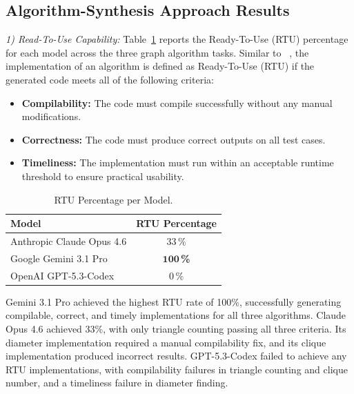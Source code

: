 
\subsection{Algorithm-Synthesis Approach Results}

\indent \textit{1) Read-To-Use Capability:} Table~\ref{tab:rtu} reports the Ready-To-Use (RTU) percentage for each model across the three graph algorithm tasks. Similar to \citeauthor{llmgen2025}~\cite{llmgen2025}, the implementation of an algorithm is defined as Ready-To-Use (RTU) if the generated code meets all of the following criteria:

\begin{itemize}
  \item \textbf{Compilability:} The code must compile successfully without any manual modifications.
  \item \textbf{Correctness:} The code must produce correct outputs on all test cases.
  \item \textbf{Timeliness:} The implementation must run within an acceptable runtime threshold to ensure practical usability.
\end{itemize}

\vspace{-1em}

\begin{table}[H]
\centering
\caption[short]{\centering RTU Percentage per Model.}
\vspace{0.5em}
\label{tab:rtu}
\begin{tabular}{lc}
\toprule
Model & RTU Percentage \\
\midrule
Anthropic Claude Opus 4.6  & $33\,\%$ \\
Google Gemini 3.1 Pro      & $\mathbf{100}\,$\textbf{\%} \\
OpenAI GPT-5.3-Codex       & $0\,\%$  \\
\bottomrule
\end{tabular}
\end{table}

\vspace{0.5em}

Gemini 3.1 Pro achieved the highest RTU rate of 100\%, successfully generating compilable, correct, and timely implementations for all three algorithms. Claude Opus 4.6 achieved 33\%, with only triangle counting passing all three criteria. Its diameter implementation required a manual compilability fix, and its clique implementation produced incorrect results. GPT-5.3-Codex failed to achieve any RTU implementations, with compilability failures in triangle counting and clique number, and a timeliness failure in diameter finding. %

